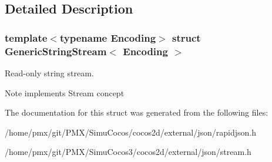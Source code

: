 \subsection{Detailed Description}
\subsubsection*{template$<$typename Encoding$>$\newline
struct Generic\+String\+Stream$<$ Encoding $>$}

Read-\/only string stream. 

\begin{DoxyNote}{Note}
implements Stream concept 
\end{DoxyNote}


The documentation for this struct was generated from the following files\+:\begin{DoxyCompactItemize}
\item 
/home/pmx/git/\+P\+M\+X/\+Simu\+Cocos/cocos2d/external/json/rapidjson.\+h\item 
/home/pmx/git/\+P\+M\+X/\+Simu\+Cocos3/cocos2d/external/json/stream.\+h\end{DoxyCompactItemize}
